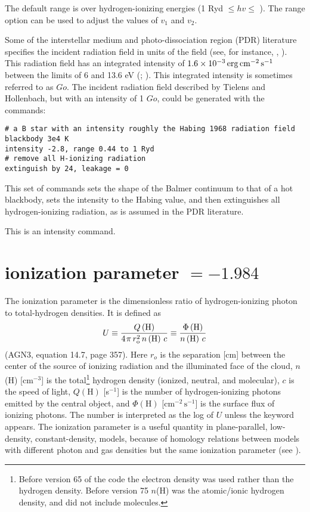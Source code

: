 The default range is over hydrogen-ionizing energies
(1 Ryd  $\le hv\le$ \egamry ).
The range option can be used to adjust
the values of $v_1$ and $v_2$.

Some of the interstellar medium and photo-dissociation region (PDR)
literature specifies the incident radiation field in units of the
\citet{Habing1968} field (see, for instance, \citealp{Tielens1985a},
\citealp{Tielens1985b}).
This
radiation field has an integrated intensity of
$1.6\times 10^{-3} \mbox{${\rm\thinspace erg}{\rm\thinspace cm}^{-2}{\rm\thinspace s}^{-1}\,$}$ between
the limits of 6 and 13.6 eV (\citealp{Tielens1985a}; \citealp{Hollenbach1991}).
This integrated intensity is sometimes referred
to as $Go$.
The incident radiation field described by Tielens and Hollenbach,
but with an
intensity of 1 $Go$, could be generated with the commands:
\begin{verbatim}
# a B star with an intensity roughly the Habing 1968 radiation field
blackbody 3e4 K
intensity -2.8, range 0.44 to 1 Ryd
# remove all H-ionizing radiation
extinguish by 24, leakage = 0
\end{verbatim}
This set of commands sets the shape of the Balmer continuum to
that of a hot blackbody, sets the intensity to the Habing value,
and then extinguishes
all hydrogen-ionizing radiation,
as is assumed in the PDR literature.

This is an intensity command.

\section{ionization parameter $= -1.984$}

The ionization parameter is the dimensionless ratio of hydrogen-ionizing
photon to total-hydrogen densities.  It is defined as
\begin{equation}
U \equiv \frac{{Q\left( {\mathrm{H}} \right)}}{{4{\kern 1pt} \pi \,r_{\mathrm{o}}^2
\,n\left( {\mathrm{H}} \right)\,c}} \equiv \frac{{\Phi \left( {\mathrm{H}}
\right)}}{{n\left( {\mathrm{H}} \right)\,c}}%
\end{equation}
(AGN3, equation 14.7, page 357).
Here $r_o$ is the separation [cm] between
the center of the source of ionizing radiation and the illuminated face
of the cloud, $n$(H) [cm$^{-3}$] is the
total\footnote{Before version 65 of the code the
electron density was used rather
than the hydrogen density.
Before version 75 $n$(H) was the atomic/ionic
hydrogen density, and did not include molecules.}
hydrogen density (ionized, neutral,
and molecular), $c$ is the speed of light,
$Q(\mathrm{H})$ [s$^{-1}$] is the number of
hydrogen-ionizing photons emitted by the central object,
and $\Phi(\mathrm{H})$
[cm$^{-2}\, \mathrm{s}^{-1}$] is the surface flux of ionizing photons.
The number is interpreted
as the log of $U$ unless the keyword  appears.
The ionization parameter
is a useful quantity in plane-parallel, low-density, constant-density,
models, because of homology relations between models with different photon
and gas densities but the same ionization parameter (see \citealp{Davidson1977}).

